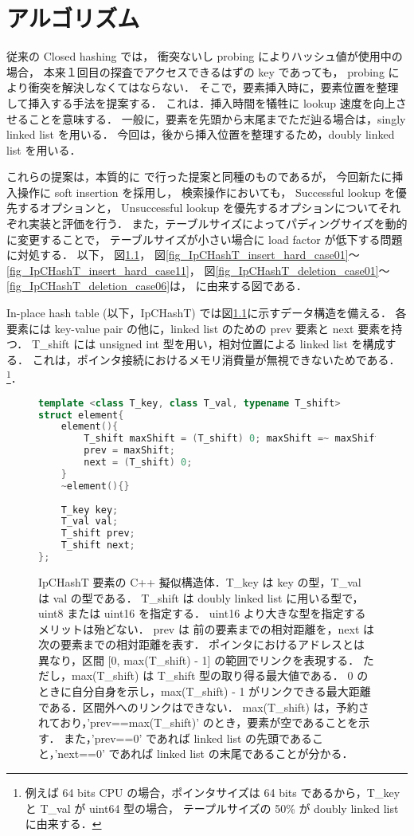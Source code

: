 \chapter{アルゴリズム}
\label{chap_Algorism}

従来の Closed hashing では，
衝突ないし probing によりハッシュ値が使用中の場合，
本来１回目の探査でアクセスできるはずの key であっても，
probing により衝突を解決しなくてはならない．
そこで，要素挿入時に，要素位置を整理して挿入する手法を提案する．
これは．挿入時間を犠牲に lookup 速度を向上させることを意味する．
一般に，要素を先頭から末尾までただ辿る場合は，singly linked list を用いる．
今回は，後から挿入位置を整理するため，doubly linked list を用いる．

これらの提案は，本質的に \cite{ADMIS2017} で行った提案と同種のものであるが，
今回新たに挿入操作に soft insertion を採用し，
検索操作においても，
Successful lookup を優先するオプションと，
Unsuccessful lookup を優先するオプションについてそれぞれ実装と評価を行う．
また，テーブルサイズによってパディングサイズを動的に変更することで，
テーブルサイズが小さい場合に load factor が低下する問題に対処する．
以下，
図\ref{fig_IpCHashT_struct}，
図\ref{fig_IpCHashT_insert_hard_case01}〜\ref{fig_IpCHashT_insert_hard_case11}，
図\ref{fig_IpCHashT_deletion_case01}〜\ref{fig_IpCHashT_deletion_case06}は，
\cite{ADMIS2017} に由来する図である．

In-place hash table (以下，IpCHashT) では図\ref{fig_IpCHashT_struct}に示すデータ構造を備える．
各要素には key-value pair の他に，linked list のための prev 要素と next 要素を持つ．
T\_shift には unsigned int 型を用い，相対位置による linked list を構成する．
これは，ポインタ接続におけるメモリ消費量が無視できないためである．
\footnote{
  例えば 64 bits CPU の場合，ポインタサイズは 64 bits であるから，T\_key と T\_val が uint64 型の場合，
  テープルサイズの 50\% が doubly linked list に由来する．
}．

\begin{figure} %
\begin{lstlisting}[language=C++]
template <class T_key, class T_val, typename T_shift>
struct element{
	element(){
		T_shift maxShift = (T_shift) 0; maxShift =~ maxShift;
		prev = maxShift;
		next = (T_shift) 0;
	}
	~element(){}
	
	T_key key;
	T_val val;
	T_shift prev;
	T_shift next;
};
\end{lstlisting}
\caption{
  IpCHashT 要素の C++ 擬似構造体．T\_key は key の型，T\_val は val の型である．
  T\_shift は doubly linked list に用いる型で，uint8 または uint16 を指定する．
  uint16 より大きな型を指定するメリットは殆どない．
  prev は 前の要素までの相対距離を，next は 次の要素までの相対距離を表す．
  ポインタにおけるアドレスとは異なり，区間 [0, max(T\_shift) - 1] の範囲でリンクを表現する．
  ただし，max(T\_shift) は T\_shift 型の取り得る最大値である．
  0 のときに自分自身を示し，max(T\_shift) - 1 がリンクできる最大距離である．区間外へのリンクはできない．
  max(T\_shift) は，予約されており，'prev==max(T\_shift)' のとき，要素が空であることを示す．
  また，'prev==0' であれば linked list の先頭であること，'next==0' であれば linked list の末尾であることが分かる．
}
\label{fig_IpCHashT_struct}
\end{figure}

